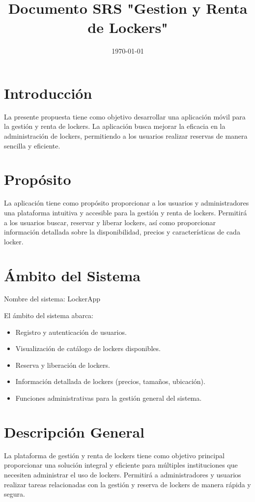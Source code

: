 \documentclass[12pt,a4paper]{article}
\title{Documento SRS "Gestion y Renta de Lockers"}
\author{}
\date{\today}
\begin{document}
\maketitle

\section{Introducción}
La presente propuesta tiene como objetivo desarrollar una aplicación móvil para la gestión y renta de lockers. La aplicación busca mejorar la eficacia en la administración de lockers, permitiendo a los usuarios realizar reservas de manera sencilla y eficiente.

\section{Propósito}
La aplicación tiene como propósito proporcionar a los usuarios y administradores una plataforma intuitiva y accesible para la gestión y renta de lockers. Permitirá a los usuarios buscar, reservar y liberar lockers, así como proporcionar información detallada sobre la disponibilidad, precios y características de cada locker.

\section{Ámbito del Sistema}
Nombre del sistema: LockerApp

El ámbito del sistema abarca:
\begin{itemize}
    \item Registro y autenticación de usuarios.
    \item Visualización de catálogo de lockers disponibles.
    \item Reserva y liberación de lockers.
    \item Información detallada de lockers (precios, tamaños, ubicación).
    \item Funciones administrativas para la gestión general del sistema.
\end{itemize}

\section{Descripción General}
La plataforma de gestión y renta de lockers tiene como objetivo principal proporcionar una solución integral y eficiente para múltiples instituciones que necesiten administrar el uso de lockers. Permitirá a administradores y usuarios realizar tareas relacionadas con la gestión y reserva de lockers de manera rápida y segura.
\end{document}
